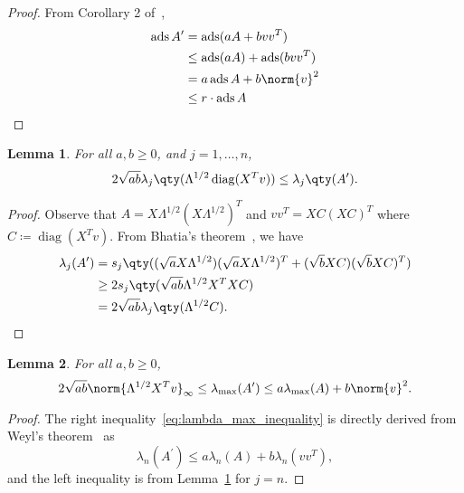 \documentclass[nobib]{my-handout}
\newtheorem{lemma}{Lemma}
\theoremstyle{definition}
\theoremstyle{remark}
\DeclareMathOperator{\ads}{ads}
\DeclareMathOperator{\diag}{diag}
\begin{document}
\begin{proof}
	From Corollary 2 of~\cite{merikoski_inequalities_2004},
	\begin{equation*}
		\begin{aligned}
			\ads{A^\prime} &= \ads(a A + b v v^T) \\
										 &\le \ads(a A) + \ads(b v v^T) \\
										 &= a \ads{A} + b \norm{v}^2 \\
										 &\le r \cdot \ads{A} \\
		\end{aligned}
	\end{equation*}
\end{proof}

\begin{lemma}\label{lem:mod_bhatia}
	For all $a, b \ge 0$, and $j=1,\dotsc,n$,
	\begin{equation*}
		2 \sqrt{ab} \lambda_j \qty(\Lambda^{1/2} \diag(X^T v)) \le
		\lambda_j \qty(A^\prime).
	\end{equation*}
\end{lemma}

\begin{proof}
	Observe that $A = X \Lambda^{1/2} (X \Lambda^{1/2})^T$ and $v v^T = X C (X
	C)^T$ where $C \coloneqq \diag(X^T v)$. From Bhatia's
	theorem~\cite{bhatia_singular_1990}, we have 
	\begin{equation*}
		\begin{aligned}
			\lambda_j (A^\prime)
			&= s_j \qty((\sqrt{a} X \Lambda^{1/2})(\sqrt{a} X \Lambda^{1/2})^T +
			(\sqrt{b} X C)(\sqrt{b} X C)^T) \\
			&\ge 2 s_j \qty(\sqrt{ab} \Lambda^{1/2} X^T X C) \\
			&= 2 \sqrt{ab} \lambda_j \qty(\Lambda^{1/2} C).
		\end{aligned}
	\end{equation*}
\end{proof}

\begin{lemma}\label{lem:bounding_lambda_max}
	For all $a, b \ge 0$,
	\begin{equation}\label{eq:lambda_max_inequality}
		2 \sqrt{ab} \norm{\Lambda^{1/2} X^T v}_{\infty} \le
		\lambda_{\max}(A^\prime) \le a \lambda_{\max}(A) + b \norm{v}^2.
	\end{equation}
\end{lemma}

\begin{proof}
	The right inequality~\eqref{eq:lambda_max_inequality} is directly derived
	from Weyl's theorem~\cite{horn_matrix_2012} as
	\begin{equation*}
		\lambda_n(A^\prime) \le a \lambda_n(A) + b \lambda_n(v v^T),
	\end{equation*}
	and the left inequality is from Lemma~\ref{lem:mod_bhatia} for $j = n$. 
\end{proof}
	
\end{document}
